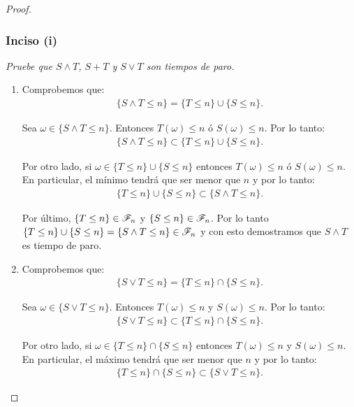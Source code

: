 \begin{proof}
	\subsubsection{Inciso (i)} 
	\emph{
		Pruebe que $ S \wedge T $, $ S + T $ y $ S \vee T$ son tiempos de paro.\\
	}
	
		\begin{enumerate}
			\item 
				Comprobemos que:
				\begin{align}
					\{ S \wedge T \leq n \} = \{ T \leq n \} \cup \{ S \leq n\}.
				\end{align}
				
				Sea $\omega \in \{ S \wedge T \leq n \}$. Entonces $T(\omega) \leq n$ ó $S(\omega) \leq n$.
				Por lo tanto:
				\begin{align}
						\{ S \wedge T \leq n \} \subset \{ T \leq n \} \cup \{ S \leq n\}.							
				\end{align}
				
				Por otro lado, si $\omega \in \{ T \leq n \} \cup \{ S \leq n\}$ entonces $T(\omega) \leq n$ ó $S(\omega) \leq n$.
				En particular, el mínimo tendrá que ser menor que $n$ y por lo tanto:
				\begin{align}
						\{ T \leq n \} \cup \{ S \leq n\} \subset \{ S \wedge T \leq n \}.						
				\end{align}
				
				Por último, $\{ T \leq n \} \in \mathscr{F}_n$ y $\{ S \leq n \} \in \mathscr{F}_n$. Por lo tanto	\\	
				$\{ T \leq n \} \cup \{ S \leq n\} = \{ S \wedge T \leq n \} \in \mathscr{F}_n$ y con esto demostramos que 
				$ S \wedge T$ es tiempo de paro.\\
				
			\item
				Comprobemos que:
				\begin{align}
					\{ S \vee T \leq n \} = \{ T \leq n \} \cap \{ S \leq n\}.
				\end{align}
				
				Sea $\omega \in \{ S \vee T \leq n \}$. Entonces $T(\omega) \leq n$ y $S(\omega) \leq n$.
				Por lo tanto:
				\begin{align}
						\{ S \vee T \leq n \} \subset \{ T \leq n \} \cap \{ S \leq n\}.							
				\end{align}
				
				Por otro lado, si $\omega \in \{ T \leq n \} \cap \{ S \leq n\}$ entonces $T(\omega) \leq n$ y $S(\omega) \leq n$.
				En particular, el máximo tendrá que ser menor que $n$ y por lo tanto:
				\begin{align}
						\{ T \leq n \} \cap \{ S \leq n\} \subset \{ S \vee T \leq n \}.						
				\end{align}
				

\end{enumerate}
\end{proof}
